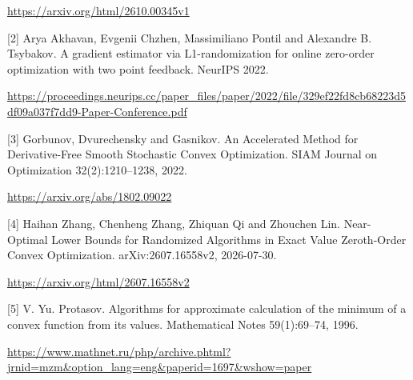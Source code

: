 \documentclass[10pt,a4paper]{article}
\begin{document}
\url{https://arxiv.org/html/2610.00345v1}

[2] Arya Akhavan, Evgenii Chzhen, Massimiliano Pontil and Alexandre B. Tsybakov. A gradient estimator via L1-randomization for online zero-order optimization with two point feedback. NeurIPS 2022.

\url{https://proceedings.neurips.cc/paper_files/paper/2022/file/329ef22fd8cb68223d5df09a037f7dd9-Paper-Conference.pdf}

[3] Gorbunov, Dvurechensky and Gasnikov. An Accelerated Method for Derivative-Free Smooth Stochastic Convex Optimization. SIAM Journal on Optimization 32(2):1210--1238, 2022.

\url{https://arxiv.org/abs/1802.09022}

[4] Haihan Zhang, Chenheng Zhang, Zhiquan Qi and Zhouchen Lin. Near-Optimal Lower Bounds for Randomized Algorithms in Exact Value Zeroth-Order Convex Optimization. arXiv:2607.16558v2, 2026-07-30.

\url{https://arxiv.org/html/2607.16558v2}

[5] V. Yu. Protasov. Algorithms for approximate calculation of the minimum of a convex function from its values. Mathematical Notes 59(1):69--74, 1996.

\url{https://www.mathnet.ru/php/archive.phtml?jrnid=mzm&option_lang=eng&paperid=1697&wshow=paper}
\end{document}
